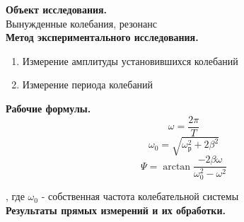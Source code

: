 \documentclass[a4paper]{article}
\begin{document}
	{\parindent=0pt\textbf{Объект исследования.}}\\
	Вынужденные колебания, резонанс\\
	
	{\parindent=0pt\textbf{Метод экспериментального исследования.}}
	\begin{enumerate}
		\item Измерение амплитуды установившихся колебаний
		\item Измерение периода колебаний\\
	\end{enumerate}

	{\parindent=0pt\textbf{Рабочие формулы.}}\\
	
	\begin{equation}
		\omega = \frac{2\pi}{T}
	\end{equation}
		\begin{equation}
		 \omega_0 = \sqrt{\omega_\text{р}^2 + 2\beta^2}
	\end{equation}
			\begin{equation}
		 \Psi = \arctan{\frac{-2\beta\omega}{\omega_0^2 - \omega^2}}
	\end{equation}

, где $ \omega_0$ - собственная частота колебательной системы\\

{\parindent=0pt\textbf{Результаты прямых измерений и их обработки.}}\\
\end{document}
